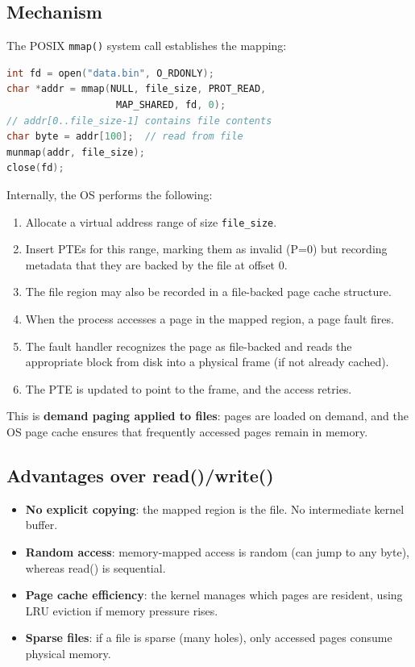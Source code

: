 \documentclass[11pt]{article}
\begin{document}
\subsection{Mechanism}

The POSIX \texttt{mmap()} system call establishes the mapping:

\begin{lstlisting}[language=C, caption={Memory-mapped file example}]
int fd = open("data.bin", O_RDONLY);
char *addr = mmap(NULL, file_size, PROT_READ,
                   MAP_SHARED, fd, 0);
// addr[0..file_size-1] contains file contents
char byte = addr[100];  // read from file
munmap(addr, file_size);
close(fd);
\end{lstlisting}

Internally, the OS performs the following:

\begin{enumerate}
    \item Allocate a virtual address range of size \texttt{file\_size}.
    \item Insert PTEs for this range, marking them as invalid (P=0) but recording metadata that they are backed by the file at offset 0.
    \item The file region may also be recorded in a file-backed page cache structure.
    \item When the process accesses a page in the mapped region, a page fault fires.
    \item The fault handler recognizes the page as file-backed and reads the appropriate block from disk into a physical frame (if not already cached).
    \item The PTE is updated to point to the frame, and the access retries.
\end{enumerate}

This is \textbf{demand paging applied to files}: pages are loaded on demand, and the OS page cache ensures that frequently accessed pages remain in memory.

\subsection{Advantages over read()/write()}

\begin{itemize}
    \item \textbf{No explicit copying}: the mapped region is the file. No intermediate kernel buffer.
    \item \textbf{Random access}: memory-mapped access is random (can jump to any byte), whereas read() is sequential.
    \item \textbf{Page cache efficiency}: the kernel manages which pages are resident, using LRU eviction if memory pressure rises.
    \item \textbf{Sparse files}: if a file is sparse (many holes), only accessed pages consume physical memory.
\end{itemize}
\end{document}
